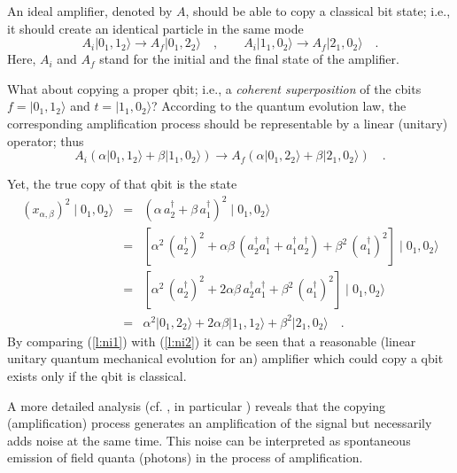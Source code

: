 An ideal amplifier, denoted by $ A$, should be able to copy a
classical bit state; i.e., it should create an identical particle in the
same mode
\begin{equation}
A_i
\vert 0_1,1_2\rangle  \rightarrow
A_f
\vert 0_1,2_2\rangle
\quad ,
\qquad
A_i
\vert 1_1,0_2\rangle  \rightarrow
A_f
\vert 2_1,0_2\rangle
\quad .
\end{equation}
Here, $A_i$ and $A_f$ stand for the initial and the final state of the
amplifier.

What about copying a proper qbit; i.e., a {\em coherent superposition}
of the cbits
$f=\vert 0_1,1_2\rangle $ and
$t=\vert 1_1,0_2\rangle       $?
According to the quantum evolution law,
the corresponding amplification process should be
representable by a linear (unitary) operator; thus
\begin{equation}
A_i
(\alpha \vert 0_1,1_2\rangle  +
\beta \vert 1_1,0_2\rangle  )\rightarrow
 A_f
(\alpha \vert 0_1,2_2\rangle   +
\beta \vert 2_1,0_2\rangle  )
\quad .
\label{l:ni1}
\end{equation}

Yet, the true copy of that qbit is the state
\begin{eqnarray}
(x_{\alpha ,\beta })^2
\mid 0_1,
0_2\rangle
&=&
(\alpha \, a_2^\dagger +\beta \, a_1^\dagger )^2 \mid 0_1, 0_2\rangle
\nonumber \\
&=&
\left[ \alpha^2 \, (a_2^\dagger)^2
+\alpha \beta \, (a_2^\dagger a_1^\dagger +a_1^\dagger a_2^\dagger)
 +\beta^2 \,(a_1^\dagger )^2 \right]
\mid 0_1,
0_2\rangle
\nonumber \\
&=&
\left[ \alpha^2 \, (a_2^\dagger)^2
+2\alpha \beta \, a_2^\dagger a_1^\dagger
 +\beta^2 \,(a_1^\dagger )^2 \right] \mid 0_1,
0_2\rangle
\nonumber \\
&=&
\alpha^2 \vert 0_1,2_2\rangle   +
2\alpha \beta \vert 1_1,1_2\rangle
  +
\beta^2 \vert 2_1,0_2\rangle
\quad .
\label{l:ni2}
\end{eqnarray}
By comparing
(\ref{l:ni1}) with
(\ref{l:ni2}) it can be seen that a reasonable (linear unitary
quantum mechanical evolution for an) amplifier which could copy a
qbit exists only if the qbit is classical.

A more detailed analysis
(cf. \cite{mandel:83,mil-hard}, in particular \cite{glauber,caves})
reveals that the copying (amplification) process generates
an amplification of the signal but necessarily adds noise at the same
time.
This noise can be interpreted as spontaneous emission of field quanta
(photons) in the process of amplification.

